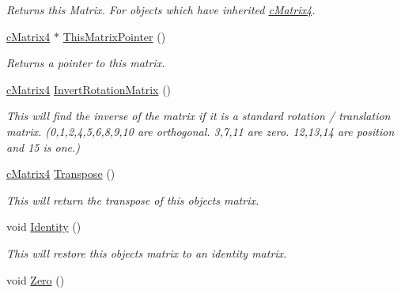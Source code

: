 \begin{DoxyCompactItemize}
\begin{DoxyCompactList}\small\item\em Returns this Matrix. For objects which have inherited \hyperlink{classc_matrix4}{cMatrix4}. \end{DoxyCompactList}\item 
\hypertarget{classc_matrix4_a5b57ac77fee2c235af694060361f84d2}{
\hyperlink{classc_matrix4}{cMatrix4} $\ast$ \hyperlink{classc_matrix4_a5b57ac77fee2c235af694060361f84d2}{ThisMatrixPointer} ()}
\label{classc_matrix4_a5b57ac77fee2c235af694060361f84d2}

\begin{DoxyCompactList}\small\item\em Returns a pointer to this matrix. \end{DoxyCompactList}\item 
\hypertarget{classc_matrix4_a7473299a57ffcfe284e6fd9005b98592}{
\hyperlink{classc_matrix4}{cMatrix4} \hyperlink{classc_matrix4_a7473299a57ffcfe284e6fd9005b98592}{InvertRotationMatrix} ()}
\label{classc_matrix4_a7473299a57ffcfe284e6fd9005b98592}

\begin{DoxyCompactList}\small\item\em This will find the inverse of the matrix if it is a standard rotation / translation matrix. (0,1,2,4,5,6,8,9,10 are orthogonal. 3,7,11 are zero. 12,13,14 are position and 15 is one.) \end{DoxyCompactList}\item 
\hypertarget{classc_matrix4_ac8b6f1a9352943cd86ef4c088c438307}{
\hyperlink{classc_matrix4}{cMatrix4} \hyperlink{classc_matrix4_ac8b6f1a9352943cd86ef4c088c438307}{Transpose} ()}
\label{classc_matrix4_ac8b6f1a9352943cd86ef4c088c438307}

\begin{DoxyCompactList}\small\item\em This will return the transpose of this objects matrix. \end{DoxyCompactList}\item 
\hypertarget{classc_matrix4_a6aa4f58a001499cd666f9d65f3a821a0}{
void \hyperlink{classc_matrix4_a6aa4f58a001499cd666f9d65f3a821a0}{Identity} ()}
\label{classc_matrix4_a6aa4f58a001499cd666f9d65f3a821a0}

\begin{DoxyCompactList}\small\item\em This will restore this objects matrix to an identity matrix. \end{DoxyCompactList}\item 
\hypertarget{classc_matrix4_acf16f37d849137d2e410ec20f2b4e74d}{
void \hyperlink{classc_matrix4_acf16f37d849137d2e410ec20f2b4e74d}{Zero} ()}
\label{classc_matrix4_acf16f37d849137d2e410ec20f2b4e74d}


\end{DoxyCompactItemize}

